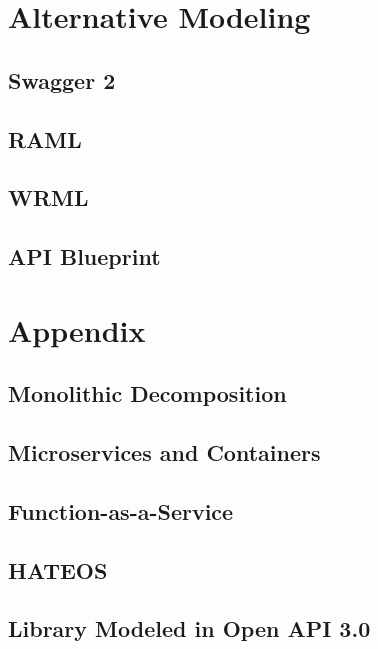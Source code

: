 \documentclass[12pt,oneside]{book} %
\begin{document}
\chapter{Alternative Modeling}
\section{Swagger 2}
\section{RAML}
\section{WRML}
\section{API Blueprint}

\chapter{Appendix}
\section{Monolithic Decomposition}
\section{Microservices and Containers}
\section{Function-as-a-Service}
\section{HATEOS}
\section{Library Modeled in Open API 3.0}



\end{document}
